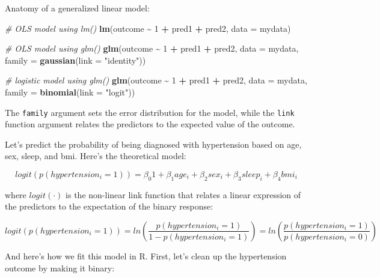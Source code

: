 \documentclass[
]{book}
\newenvironment{Shaded}{\begin{snugshade}}{\end{snugshade}}
\newcommand{\CommentTok}[1]{\textcolor[rgb]{0.56,0.35,0.01}{\textit{#1}}}
\newcommand{\DataTypeTok}[1]{\textcolor[rgb]{0.13,0.29,0.53}{#1}}
\newcommand{\DecValTok}[1]{\textcolor[rgb]{0.00,0.00,0.81}{#1}}
\newcommand{\KeywordTok}[1]{\textcolor[rgb]{0.13,0.29,0.53}{\textbf{#1}}}
\newcommand{\NormalTok}[1]{#1}
\newcommand{\OperatorTok}[1]{\textcolor[rgb]{0.81,0.36,0.00}{\textbf{#1}}}
\newcommand{\StringTok}[1]{\textcolor[rgb]{0.31,0.60,0.02}{#1}}
\begin{document}
Anatomy of a generalized linear model:

\begin{Shaded}
\begin{Highlighting}[]
  \CommentTok{\# OLS model using lm()}
  \KeywordTok{lm}\NormalTok{(outcome }\OperatorTok{\textasciitilde{}}\StringTok{ }\DecValTok{1} \OperatorTok{+}\StringTok{ }\NormalTok{pred1 }\OperatorTok{+}\StringTok{ }\NormalTok{pred2, }
     \DataTypeTok{data =}\NormalTok{ mydata)}

  \CommentTok{\# OLS model using glm()}
  \KeywordTok{glm}\NormalTok{(outcome }\OperatorTok{\textasciitilde{}}\StringTok{ }\DecValTok{1} \OperatorTok{+}\StringTok{ }\NormalTok{pred1 }\OperatorTok{+}\StringTok{ }\NormalTok{pred2, }
      \DataTypeTok{data =}\NormalTok{ mydata, }
      \DataTypeTok{family =} \KeywordTok{gaussian}\NormalTok{(}\DataTypeTok{link =} \StringTok{"identity"}\NormalTok{))}
 
  \CommentTok{\# logistic model using glm()}
  \KeywordTok{glm}\NormalTok{(outcome }\OperatorTok{\textasciitilde{}}\StringTok{ }\DecValTok{1} \OperatorTok{+}\StringTok{ }\NormalTok{pred1 }\OperatorTok{+}\StringTok{ }\NormalTok{pred2, }
      \DataTypeTok{data =}\NormalTok{ mydata, }
      \DataTypeTok{family =} \KeywordTok{binomial}\NormalTok{(}\DataTypeTok{link =} \StringTok{"logit"}\NormalTok{))}
\end{Highlighting}
\end{Shaded}

The \texttt{family} argument sets the error distribution for the model, while the \texttt{link} function argument relates the predictors to the expected value of the outcome.

Let's predict the probability of being diagnosed with hypertension based on age, sex, sleep, and bmi. Here's the theoretical model:

\[
logit(p(hypertension_i = 1)) = \beta_{0}1 + \beta_1age_i + \beta_2sex_i + \beta_3sleep_i + \beta_4bmi_i 
\]

where \(logit(\cdot)\) is the non-linear link function that relates a linear expression of the predictors to the expectation of the binary response:

\[
logit(p(hypertension_i = 1)) = ln \left( \frac{p(hypertension_i = 1)}{1-p(hypertension_i = 1)} \right) = ln \left( \frac{p(hypertension_i = 1)}{p(hypertension_i = 0)} \right)
\]

And here's how we fit this model in R. First, let's clean up the hypertension outcome by making it binary:
\end{document}
